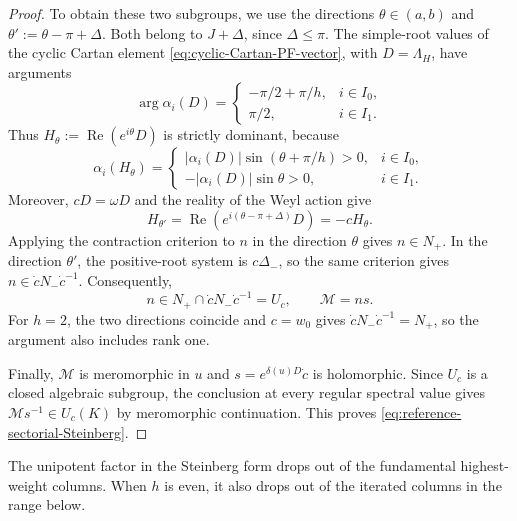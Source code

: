 \documentclass[11pt,leqno]{amsart}
\numberwithin{equation}{section}
\theoremstyle{plain}
\theoremstyle{definition}
\theoremstyle{plain}
\theoremstyle{definition}
\theoremstyle{remark}
\begin{document}
\begin{proof}
To obtain these two subgroups, we use the directions $\theta\in(a,b)$ and $\theta':=\theta-\pi+\Delta$.  Both belong to $J+\Delta$, since $\Delta\le\pi$.  The simple-root values of the cyclic Cartan element \eqref{eq:cyclic-Cartan-PF-vector}, with $D=\Lambda_H$, have arguments
\[
 \arg\alpha_i(D)=
 \begin{cases}
 -\pi/2+\pi/h,&i\in I_0,\\
 \pi/2,&i\in I_1.
 \end{cases}
\]
Thus $H_\theta:=\operatorname{Re}(e^{i\theta}D)$ is strictly dominant, because
\[
 \alpha_i(H_\theta)=
 \begin{cases}
 |\alpha_i(D)|\sin(\theta+\pi/h)>0,&i\in I_0,\\
 -|\alpha_i(D)|\sin\theta>0,&i\in I_1.
 \end{cases}
\]
Moreover, $cD=\omega D$ and the reality of the Weyl action give
\[
 H_{\theta'}=\operatorname{Re}(e^{i(\theta-\pi+\Delta)}D)
 =-cH_\theta.
\]
Applying the contraction criterion to $n$ in the direction $\theta$ gives $n\in N_+$.  In the direction $\theta'$, the positive-root system is $c\Delta_-$, so the same criterion gives $n\in\dot cN_-\dot c^{-1}$.  Consequently,
\[
 n\in N_+\cap\dot cN_-\dot c^{-1}=U_c,
 \qquad \mathscr M=ns.
\]
For $h=2$, the two directions coincide and $c=w_0$ gives $\dot cN_-\dot c^{-1}=N_+$, so the argument also includes rank one.

Finally, $\mathscr M$ is meromorphic in $u$ and $s=e^{\delta(u)D}\dot c$ is holomorphic.  Since $U_c$ is a closed algebraic subgroup, the conclusion at every regular spectral value gives $\mathscr M s^{-1}\in U_c(K)$ by meromorphic continuation.  This proves \eqref{eq:reference-sectorial-Steinberg}.
\end{proof}

The unipotent factor in the Steinberg form drops out of the fundamental highest-weight columns.  When $h$ is even, it also drops out of the iterated columns in the range below.
\end{document}
